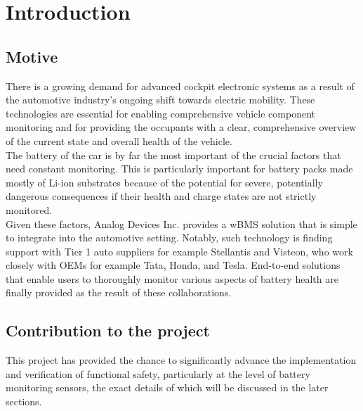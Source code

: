 \chapter{Introduction} %

\label{ch:intro}


\section{Motive}
There is a growing demand for advanced cockpit electronic systems as a result of the automotive industry's ongoing shift towards electric mobility. These technologies are essential for enabling comprehensive vehicle component monitoring and for providing the occupants with a clear, comprehensive overview of the current state and overall health of the vehicle. \\
The battery of the car is by far the most important of the crucial factors that need constant monitoring. This is particularly important for battery packs made mostly of Li-ion substrates because of the potential for severe, potentially dangerous consequences if their health and charge states are not strictly monitored. \\
Given these factors, Analog Devices Inc. provides a wBMS solution that is simple to integrate into the automotive setting. Notably, such technology is finding support with Tier 1 auto suppliers for example Stellantis and Visteon, who work closely with OEMs for example Tata, Honda, and Tesla. End-to-end solutions that enable users to thoroughly monitor various aspects of battery health are finally provided as the result of these collaborations.
\section{Contribution to the project}
This project has provided the chance to significantly advance the implementation and verification of functional safety, particularly at the level of battery monitoring sensors, the exact details of which will be discussed in the later sections. 